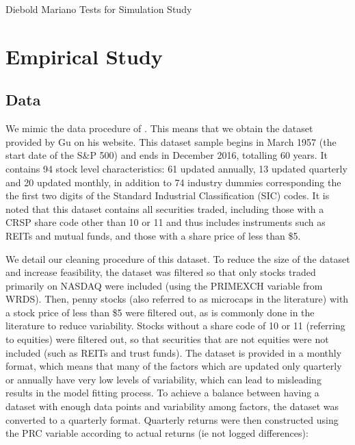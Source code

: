 \documentclass[a4paper, table]{article}
\begin{document}
\begin{table}
	\caption{Diebold Mariano Tests for Simulation Study}
\end{table}


\section{Empirical Study}

\subsection{Data}

We mimic the data procedure of \cite{gu_empirical_2018}. This means that we obtain the dataset provided by Gu on his website. This dataset sample begins in March 1957 (the start date of the S\&P 500) and ends in December 2016, totalling 60 years. It contains 94 stock level characteristics: 61 updated annually, 13 updated quarterly and 20 updated monthly, in addition to 74 industry dummies corresponding the the first two digits of the Standard Industrial Classification (SIC) codes. It is noted that this dataset contains all securities traded, including those with a CRSP share code other than 10 or 11 and thus includes instruments such as REITs and mutual funds, and those with a share price of less than \$5.


We detail our cleaning procedure of this dataset. To reduce the size of the dataset and increase feasibility, the dataset was filtered so that only stocks traded primarily on NASDAQ were included (using the PRIMEXCH variable from WRDS). Then, penny stocks (also referred to as microcaps in the literature) with a stock price of less than \$5 were filtered out, as is commonly done in the literature to reduce variability. Stocks without a share code of 10 or 11 (referring to equities) were filtered out, so that securities that are not equities were not included (such as REITs and trust funds). The dataset is provided in a monthly format, which means that many of the factors which are updated only quarterly or annually have very low levels of variability, which can lead to misleading results in the model fitting process. To achieve a balance between having a dataset with enough data points and variability among factors, the dataset was converted to a quarterly format. Quarterly returns were then constructed using the PRC variable according to actual returns (ie not logged differences):
\end{document}
